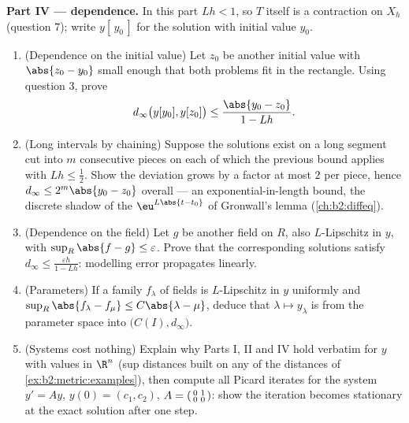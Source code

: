 \begin{problem}
\medskip
\noindent\textbf{Part IV ---  dependence.} In this
part $Lh < 1$, so $T$ itself is a contraction on $X_h$ (question
7); write $y[\,y_0\,]$ for the solution with initial value
$y_0$.
\begin{enumerate}[resume]
  \item (Dependence on the initial value) Let $z_0$ be another
        initial value with $\abs{z_0 - y_0}$ small enough that
        both problems fit in the rectangle. Using question 3,
        prove
        \[
        d_\infty\bigl(y[y_0], y[z_0]\bigr) \leq
        \frac{\abs{y_0 - z_0}}{1 - Lh}.
        \]
  \item (Long intervals by chaining) Suppose the solutions exist
        on a long segment cut into $m$ consecutive pieces on
        each of which the previous bound applies with $Lh \leq
        \frac12$. Show the deviation grows by a factor at most
        $2$ per piece, hence $d_\infty \leq 2^m\abs{y_0 - z_0}$
        overall --- an exponential-in-length bound, the discrete
        shadow of the $\eu^{L\abs{t - t_0}}$ of Gronwall's lemma
        (\cref{ch:b2:diffeq}).
  \item (Dependence on the field) Let $g$ be another field on
        $R$, also $L$-Lipschitz in $y$, with $\sup_R \abs{f - g}
        \leq \varepsilon$. Prove that the corresponding
        solutions satisfy $d_\infty \leq
        \frac{\varepsilon h}{1 - Lh}$: modelling error
        propagates linearly.
  \item (Parameters) If a family $f_\lambda$ of fields is
        $L$-Lipschitz in $y$ uniformly and $\sup_R\abs{f_\lambda
        - f_\mu} \leq C\abs{\lambda - \mu}$, deduce that
        $\lambda \mapsto y_\lambda$ is  from the
        parameter space into $\bigl(C(I), d_\infty\bigr)$.
  \item (Systems cost nothing) Explain why Parts I, II and IV
        hold verbatim for $y$ with values in $\R^n$ (sup
        distances built on any of the distances of
        \cref{ex:b2:metric:examples}), then compute all Picard
        iterates for the system $y' = Ay$, $y(0) = (c_1,
        c_2)$, $A = \begin{psmallmatrix} 0 & 1\\ 0 &
        0\end{psmallmatrix}$: show the iteration becomes
        stationary at the exact solution after one step.
\end{enumerate}


\end{problem}
